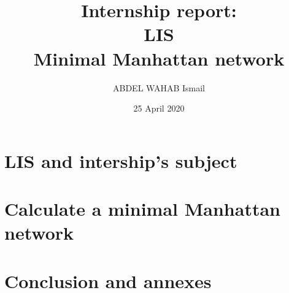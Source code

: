 \documentclass[11pt]{report}
\title{\textbf{Internship report: \\
			LIS\\  Minimal Manhattan network}}
\author{ABDEL WAHAB Ismail}
\date{25 April 2020}
\begin{document}
\maketitle
\thispagestyle{empty}
\renewcommand{\contentsname}{Summary}
\tableofcontents
\newpage

\iffalse --------------  Document Content-------------------------- \fi

\part{LIS and intership's subject}


\part{Calculate a minimal Manhattan network}






\part{Conclusion and annexes}



\end{document}
